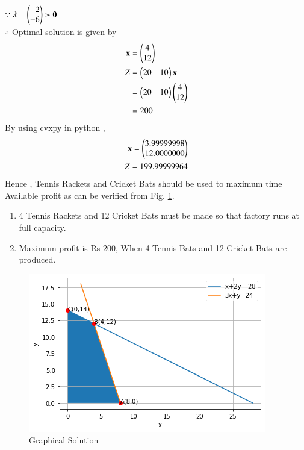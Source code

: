 $\because \boldsymbol{\lambda}=\begin{pmatrix}-2 \\ -6\end{pmatrix} \succ \mathbf{0} $
\\
$\therefore$ Optimal solution is given by
\begin{align}
\mathbf{x} &= \begin{pmatrix}4\\12\end{pmatrix} \\
Z &= \begin{pmatrix}20 & 10\end{pmatrix}\mathbf{x} \\
&= \begin{pmatrix}20 & 10\end{pmatrix}\begin{pmatrix}4 \\ 12\end{pmatrix} \\
&= 200
\end{align}
By using cvxpy in python ,
\begin{align}
\mathbf{x}=\begin{pmatrix}3.99999998\\12.0000000\end{pmatrix}\\
Z = 199.99999964
\end{align}
Hence , Tennis Rackets and  Cricket Bats should be used to maximum time Available profit  as can be
verified from Fig. \ref{opt/14/fig: Graphical Solution}.	
\begin{enumerate}
\item 4 Tennis Rackets and 12 Cricket Bats must be made so that factory runs at full capacity.
\item Maximum profit is Rs 200, When 4 Tennis Bats and 12 Cricket Bats are produced.
\end{enumerate}
%
\begin{figure}[!ht]
\centering
\includegraphics[width=\columnwidth]{solutions/su2021/2/14/download.png}
\caption{Graphical Solution}
\label{opt/14/fig: Graphical Solution}	
\end{figure}

